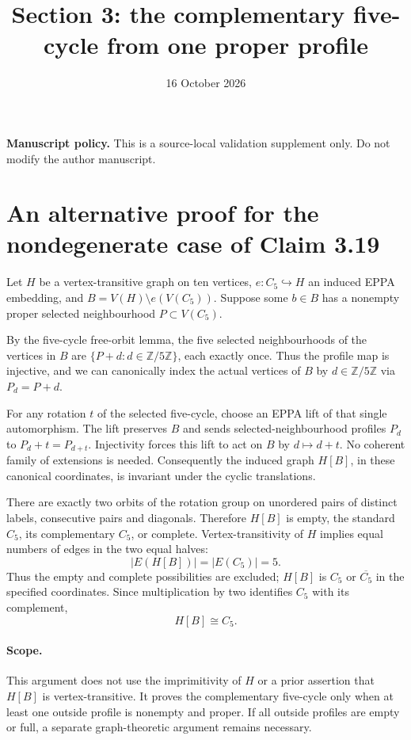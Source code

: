 \documentclass[11pt,a4paper]{article}
\title{Section 3: the complementary five-cycle from one proper profile}
\date{16 October 2026}
\begin{document}
\maketitle
\noindent\textbf{Manuscript policy.}
This is a source-local validation supplement only.
Do not modify the author manuscript.

\section*{An alternative proof for the nondegenerate case of Claim 3.19}
Let \(H\) be a vertex-transitive graph on ten vertices,
\(e:C_5\hookrightarrow H\) an induced EPPA embedding,
and \(B=V(H)\setminus e(V(C_5))\).
Suppose some \(b\in B\) has a nonempty proper
selected neighbourhood \(P\subset V(C_5)\).

By the five-cycle free-orbit lemma, the five selected
neighbourhoods of the vertices in \(B\) are
\(\{P+d:d\in\mathbb Z/5\mathbb Z\}\), each exactly once.
Thus the profile map is injective, and we can canonically
index the actual vertices of \(B\) by \(d\in\mathbb Z/5\mathbb Z\)
via \(P_d=P+d\).

For any rotation \(t\) of the selected five-cycle,
choose an EPPA lift of that single automorphism.
The lift preserves \(B\) and sends selected-neighbourhood
profiles \(P_d\) to \(P_d+t=P_{d+t}\).
Injectivity forces this lift to act on \(B\) by
\(d\mapsto d+t\). No coherent family of extensions is needed.
Consequently the induced graph \(H[B]\), in these canonical
coordinates, is invariant under the cyclic translations.

There are exactly two orbits of the rotation group on
unordered pairs of distinct labels, consecutive pairs and
diagonals. Therefore \(H[B]\) is empty, the standard
\(C_5\), its complementary \(C_5\), or complete.
Vertex-transitivity of \(H\) implies equal numbers of edges
in the two equal halves:
\[
  |E(H[B])|=|E(C_5)|=5.
\]
Thus the empty and complete possibilities are excluded;
\(H[B]\) is \(C_5\) or \(\overline{C_5}\) in the
specified coordinates. Since multiplication by two
identifies \(C_5\) with its complement,
\[
       H[B]\cong C_5.
\]

\paragraph{Scope.}
This argument does not use the imprimitivity of \(H\)
or a prior assertion that \(H[B]\) is vertex-transitive.
It proves the complementary five-cycle only when
at least one outside profile is nonempty and proper.
If all outside profiles are empty or full,
a separate graph-theoretic argument remains necessary.
\end{document}
